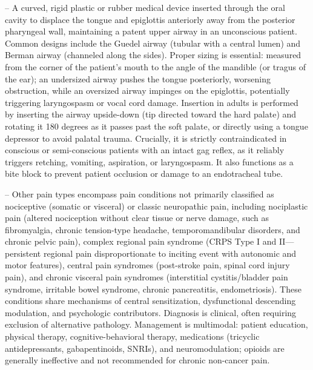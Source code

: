 -- A curved, rigid plastic or rubber medical device inserted through the oral cavity to displace the tongue and epiglottis anteriorly away from the posterior pharyngeal wall, maintaining a patent upper airway in an unconscious patient. Common designs include the Guedel airway (tubular with a central lumen) and Berman airway (channeled along the sides). Proper sizing is essential: measured from the corner of the patient's mouth to the angle of the mandible (or tragus of the ear); an undersized airway pushes the tongue posteriorly, worsening obstruction, while an oversized airway impinges on the epiglottis, potentially triggering laryngospasm or vocal cord damage. Insertion in adults is performed by inserting the airway upside-down (tip directed toward the hard palate) and rotating it 180 degrees as it passes past the soft palate, or directly using a tongue depressor to avoid palatal trauma. Crucially, it is strictly contraindicated in conscious or semi-conscious patients with an intact gag reflex, as it reliably triggers retching, vomiting, aspiration, or laryngospasm. It also functions as a bite block to prevent patient occlusion or damage to an endotracheal tube.

-- Other pain types encompass pain conditions not primarily classified as nociceptive (somatic or visceral) or classic neuropathic pain, including nociplastic pain (altered nociception without clear tissue or nerve damage, such as fibromyalgia, chronic tension-type headache, temporomandibular disorders, and chronic pelvic pain), complex regional pain syndrome (CRPS Type I and II—persistent regional pain disproportionate to inciting event with autonomic and motor features), central pain syndromes (post-stroke pain, spinal cord injury pain), and chronic visceral pain syndromes (interstitial cystitis/bladder pain syndrome, irritable bowel syndrome, chronic pancreatitis, endometriosis). These conditions share mechanisms of central sensitization, dysfunctional descending modulation, and psychologic contributors. Diagnosis is clinical, often requiring exclusion of alternative pathology. Management is multimodal: patient education, physical therapy, cognitive-behavioral therapy, medications (tricyclic antidepressants, gabapentinoids, SNRIs), and neuromodulation; opioids are generally ineffective and not recommended for chronic non-cancer pain.

